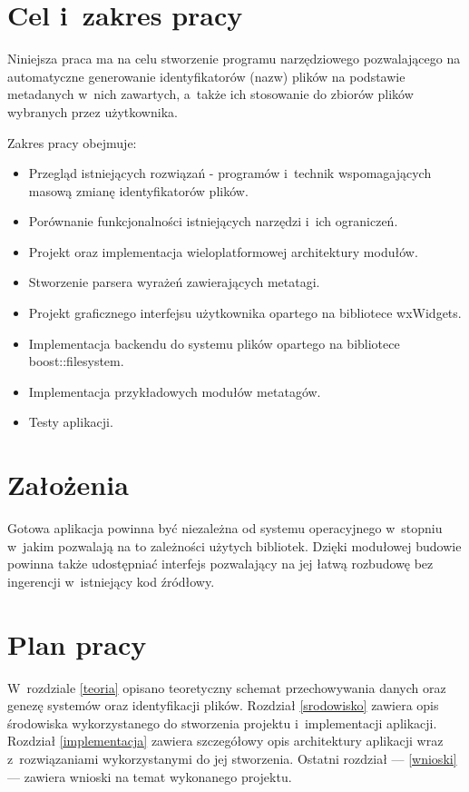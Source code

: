 \section{Cel i~zakres pracy}
\par
Niniejsza praca ma na celu stworzenie programu narzędziowego pozwalającego na automatyczne generowanie identyfikatorów (nazw) plików na podstawie metadanych w~nich zawartych, a~także ich stosowanie do zbiorów plików wybranych przez użytkownika.

\par
Zakres pracy obejmuje:
\begin{itemize}
\item Przegląd istniejących rozwiązań - programów i~technik wspomagających masową zmianę identyfikatorów plików.
\item Porównanie funkcjonalności istniejących narzędzi i~ich ograniczeń.
\item Projekt oraz implementacja wieloplatformowej architektury modułów.
\item Stworzenie parsera wyrażeń zawierających metatagi.
\item Projekt graficznego interfejsu użytkownika opartego na bibliotece wxWidgets.
\item Implementacja backendu do systemu plików opartego na bibliotece boost::filesystem.
\item Implementacja przykładowych modułów metatagów.
\item Testy aplikacji.
\end{itemize}

\section{Założenia}
\label{zalozenia}
Gotowa aplikacja powinna być niezależna od systemu operacyjnego w~stopniu w~jakim pozwalają na to zależności użytych bibliotek. Dzięki modułowej budowie powinna także udostępniać interfejs pozwalający na jej łatwą rozbudowę bez ingerencji w~istniejący kod źródłowy.

\section{Plan pracy}
\label{plan-pracy}
 W~rozdziale \ref{teoria} opisano teoretyczny schemat przechowywania danych oraz genezę systemów oraz identyfikacji plików. Rozdział \ref{srodowisko} zawiera opis środowiska wykorzystanego do stworzenia projektu i~implementacji aplikacji.
Rozdział \ref{implementacja} zawiera szczegółowy opis architektury aplikacji wraz z~rozwiązaniami wykorzystanymi do jej stworzenia.
Ostatni rozdział --- \ref{wnioski} --- zawiera wnioski na temat wykonanego projektu.

\clearpage
